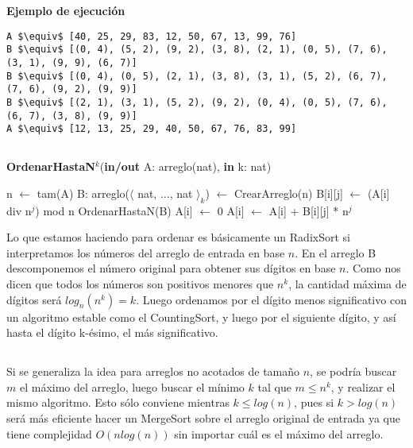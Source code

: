 \textbf{Ejemplo de ejecución}

\begin{lstlisting}
A $\equiv$ [40, 25, 29, 83, 12, 50, 67, 13, 99, 76]
B $\equiv$ [(0, 4), (5, 2), (9, 2), (3, 8), (2, 1), (0, 5), (7, 6), (3, 1), (9, 9), (6, 7)]
B $\equiv$ [(0, 4), (0, 5), (2, 1), (3, 8), (3, 1), (5, 2), (6, 7), (7, 6), (9, 2), (9, 9)]
B $\equiv$ [(2, 1), (3, 1), (5, 2), (9, 2), (0, 4), (0, 5), (7, 6), (6, 7), (3, 8), (9, 9)]
A $\equiv$ [12, 13, 25, 29, 40, 50, 67, 76, 83, 99]
\end{lstlisting}

\subsection{}

\begin{algorithm}[H]
\caption{
    \textbf{OrdenarHastaN$^k$}(\textbf{in/out} A: arreglo(nat), \textbf{in} k: nat)
}
\begin{algorithmic}[1]
    \State n $\gets$ tam(A)
    \State B: arreglo($\langle$ nat, $\dots$, nat $\rangle_k$) $\gets$ CrearArreglo(n) 
     
         
            \State B[i][j] $\gets$ (A[i] div n$^j$) mod n
        \EndFor
    \EndFor
     
        \State OrdenarHastaN(B) 
    \EndFor
     
        \State A[i] $\gets$ 0
         
            \State A[i] $\gets$ A[i] + B[i][j] * n$^j$
        \EndFor
    \EndFor
\end{algorithmic}
\end{algorithm}

Lo que estamos haciendo para ordenar es básicamente un RadixSort si interpretamos los números del arreglo de entrada en base $n$. En el arreglo B descomponemos el número original para obtener sus dígitos en base $n$. Como nos dicen que todos los números son positivos menores que $n^k$, la cantidad máxima de dígitos será $log_n(n^k) = k$. Luego ordenamos por el dígito menos significativo con un algoritmo estable como el CountingSort, y luego por el siguiente dígito, y así hasta el dígito k-ésimo, el más significativo.

\subsection{}

Si se generaliza la idea para arreglos no acotados de tamaño $n$, se podría buscar $m$ el máximo del arreglo, luego buscar el mínimo $k$ tal que $m \leq n^k$, y realizar el mismo algoritmo. Esto sólo conviene mientras $k \leq log(n)$, pues si $k > log(n)$ será más eficiente hacer un MergeSort sobre el arreglo original de entrada ya que tiene complejidad $O(n log(n))$ sin importar cuál es el máximo del arreglo.


